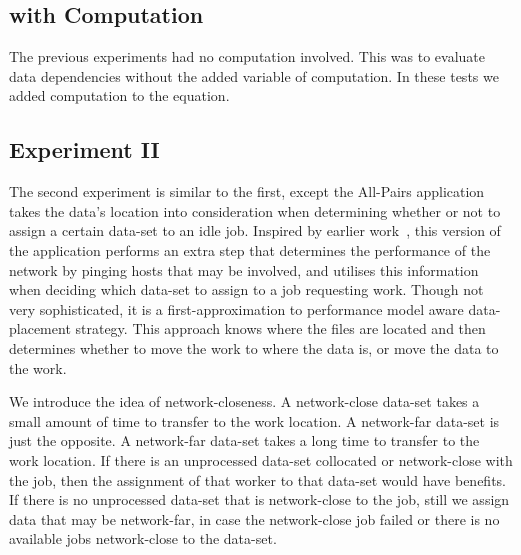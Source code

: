 \documentclass{rspublic}
\begin{document}
\subsection{with Computation}
The previous experiments had no computation involved.  This was to
evaluate data dependencies without the added variable of computation.
In these tests we added computation to the equation.

 

\subsection{Experiment II} The second experiment is similar to the
first, except the All-Pairs application takes the data's location into
consideration when determining whether or not to assign a certain
data-set to an idle job.  Inspired by earlier work~\citep{netperf},
this version of the application performs an extra step that determines
the performance of the network by pinging hosts that may be involved,
and utilises this information when deciding which data-set to assign
to a job requesting work.  Though not very sophisticated, it is a
first-approximation to performance model aware data-placement strategy.
This approach knows where the files are located and then determines
whether to move the work to where the data is, or move the data to the
work.  

We introduce the idea of network-closeness.  A network-close data-set
takes a small amount of time to transfer to the work location.  A
network-far data-set is just the opposite.  A network-far data-set takes
a long time to transfer to the work location.  If there is an
unprocessed data-set collocated or network-close with the job, then the
assignment of that worker to that data-set would have benefits.  If
there is no unprocessed data-set that is network-close to the job, still
we assign data that may be network-far, in case the network-close job
failed or there is no available jobs network-close to the data-set.

\end{document}
